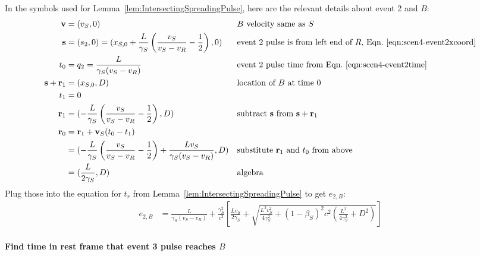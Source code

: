 \documentclass[a4paper]{article}
\theoremstyle{plain}
\theoremstyle{definition}
\newcommand{\vect}[1]{\mathbf{#1}}
\begin{document}
In the symbols used for Lemma~\ref{lem:IntersectingSpreadingPulse},
here are the relevant details about event 2 and $B$:
\begin{align*}
\vect{v} & = (v_S, 0) & & \text{$B$ velocity same as $S$} \\
\vect{s} & = (s_2,0) = (x_{S,0} + \frac{L}{\gamma_S} \left( \frac{v_S}{v_S - v_R} - \frac{1}{2} \right), 0) & & \text{event 2 pulse is from left end of $R$, Eqn.~\eqref{eqn:scen4-event2xcoord}} \\
t_0 & = q_2 = \frac{L}{\gamma_S(v_S - v_R)} & & \text{event 2 pulse time from Eqn.~\eqref{eqn:scen4-event2time}} \\
\vect{s} + \vect{r}_1 & = (x_{S,0}, D) & & \text{location of $B$ at time 0} \\
t_1 & = 0 \\
\vect{r}_1 & = (-\frac{L}{\gamma_S} \left( \frac{v_S}{v_S - v_R} - \frac{1}{2} \right), D) & & \text{subtract $\vect{s}$ from $\vect{s}+\vect{r}_1$} \\
\vect{r}_0
  & = \vect{r}_1 + \vect{v}_S(t_0-t_1) \\
  & = (-\frac{L}{\gamma_S} \left( \frac{v_S}{v_S - v_R} - \frac{1}{2} \right) + \frac{Lv_S}{\gamma_S(v_S - v_R)}, D) & & \text{substitute $\vect{r}_1$ and $t_0$ from above} \\
  & = (\frac{L}{2\gamma_S}, D) & & \text{algebra}
\end{align*}
Plug those into the equation for $t_r$ from
Lemma~\ref{lem:IntersectingSpreadingPulse} to get $e_{2,B}$:
\begin{align*}
e_{2,B} & = \frac{L}{\gamma_S(v_S - v_R)} + \frac{\gamma_S^2}{c^2} \left[ \frac{Lv_S}{2\gamma_S} + \sqrt{\frac{L^2v_S^2}{4\gamma_S^2} + (1-\beta_S)^2c^2 (\frac{L^2}{4\gamma_S^2} + D^2)} \right]
\end{align*}


\paragraph{Find time in rest frame that event 3 pulse reaches $B$}
\end{document}
